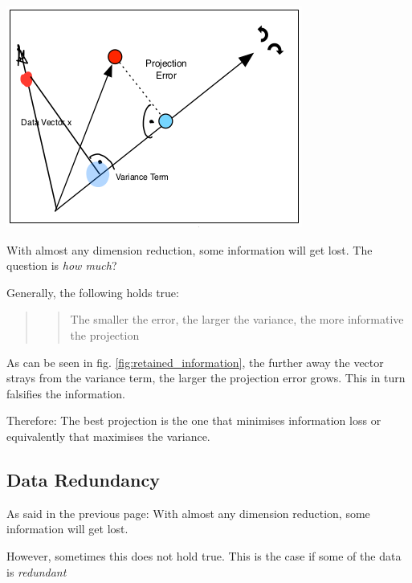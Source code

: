 \documentclass[11pt]{article}
\begin{document}
\begin{minipage}{0.45\textwidth}
    \includegraphics[keepaspectratio=true,height=11\baselineskip]{retained_information.png}
    \label{fig:retained_information}
\end{minipage} \hfill
\begin{minipage}{0.45\textwidth}
    With almost any dimension reduction, some information will get lost. The question is \textit{how much}?

    Generally, the following holds true:

    \begin{quote}
        \blockquote{The smaller the error, the larger the variance, the more informative the projection}
    \end{quote}

    As can be seen in fig. \ref{fig:retained_information}, the further away the vector strays from the variance term, the larger the projection error grows. This in turn falsifies the information.

    Therefore: The best projection is the one that minimises information loss or equivalently that maximises the variance.
\end{minipage}

\subsection{Data Redundancy}

As said in the previous page: With almost any dimension reduction, some information will get lost.

However, sometimes this does not hold true. This is the case if some of the data is \textit{redundant}

\vspace{10px}
\end{document}
